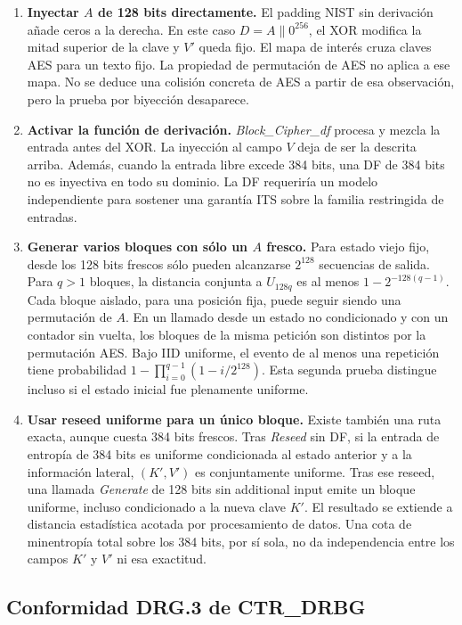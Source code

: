 \documentclass[11pt,a4paper]{article}
\begin{document}
\begin{enumerate}
\item \textbf{Inyectar $A$ de 128 bits directamente.}
El padding NIST sin derivación añade ceros a la derecha. En este caso
$D=A\|0^{256}$, el XOR modifica la mitad superior de la clave
y $V'$ queda fijo. El mapa de interés cruza claves AES para un
texto fijo. La propiedad de permutación de AES no aplica a ese
mapa. No se deduce una colisión concreta de AES a partir de
esa observación, pero la prueba por biyección desaparece.
\item \textbf{Activar la función de derivación.}
\emph{Block\_Cipher\_df} procesa y mezcla la entrada antes del
XOR. La inyección al campo $V$ deja de ser la descrita arriba.
Además, cuando la entrada libre excede 384 bits, una DF de
384 bits no es inyectiva en todo su dominio. La DF requeriría
un modelo independiente para sostener una garantía ITS sobre
la familia restringida de entradas.
\item \textbf{Generar varios bloques con sólo un $A$ fresco.}
Para estado viejo fijo, desde los 128 bits frescos sólo pueden
alcanzarse $2^{128}$ secuencias de salida. Para $q>1$ bloques,
la distancia conjunta a $U_{128q}$ es al menos
$1-2^{-128(q-1)}$. Cada bloque aislado, para una posición fija,
puede seguir siendo una permutación de $A$.
En un llamado desde un estado no condicionado y con un contador
sin vuelta, los bloques de la misma petición son distintos por
la permutación AES. Bajo IID uniforme, el evento de al menos
una repetición tiene probabilidad
$1-\prod_{i=0}^{q-1}(1-i/2^{128})$.
Esta segunda prueba distingue incluso si el estado inicial
fue plenamente uniforme.
\item \textbf{Usar reseed uniforme para un único bloque.}
Existe también una ruta exacta, aunque cuesta 384 bits frescos.
Tras \emph{Reseed} sin DF, si la entrada de entropía de
384 bits es uniforme condicionada al estado anterior y a la
información lateral, $(K',V')$ es conjuntamente uniforme.
Tras ese reseed, una llamada \emph{Generate} de 128 bits
sin additional input emite un bloque uniforme, incluso
condicionado a la nueva clave $K'$. El resultado se extiende
a distancia estadística acotada por procesamiento de datos.
Una cota de minentropía total sobre los 384 bits, por sí
sola, no da independencia entre los campos $K'$ y $V'$ ni
esa exactitud.
\end{enumerate}

\subsection{Conformidad DRG.3 de CTR\_DRBG}
\end{document}
